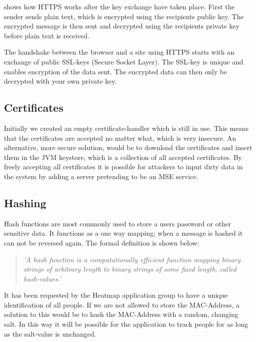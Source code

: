  shows how HTTPS works after the key exchange have taken place. First the sender sends plain text, which is encrypted using the recipients public key. The encrypted message is then sent and decrypted using the recipients private key before plain text is received.

The handshake between the browser and a site using HTTPS starts with an exchange of public SSL-keys (Secure Socket Layer). The SSL-key is unique and enables encryption of the data sent. The encrypted data can then only be decrypted with your own private key\cite{HTTPS}. 

\subsection*{Certificates}
Initially we created an empty certificate-handler which is still in use. This means that the certificates are accepted no matter what, which is very insecure. An alternative, more secure solution, would be to download the certificates and insert them in the JVM keystore, which is a collection of all accepted certificates. By freely accepting all certificates it is possible for attackers to input dirty data in the system by adding a server pretending to be an MSE service.

\subsection*{Hashing}
Hash functions are most commonly used to store a users password or other sensitive data. It functions as a one way mapping; when a message is hashed it can not be reversed again. The formal definition is shown below:
\begin{quote}
\textit{'A hash function is a computationally efficient function mapping binary strings of arbitrary length to binary strings of some fixed length, called hash-values.'\cite{Hash_def}}
\end{quote}

It has been requested by the Heatmap application group to have a unique identification of all people. If we are not allowed to store the MAC-Address, a solution to this would be to hash the MAC-Address with a random, changing salt. In this way it will be possible for the application to track people for as long as the salt-value is unchanged.

